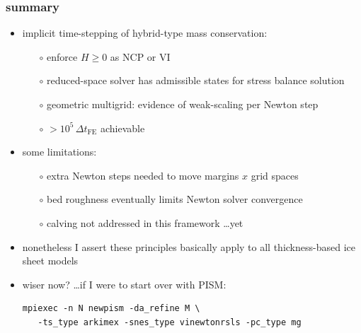 \documentclass[hide notes,intlimits,usenames,dvipsnames]{beamer}
\begin{document}
\begin{frame}[fragile]
\frametitle{summary}
\begin{itemize}
\item implicit time-stepping of hybrid-type mass conservation:
  \begin{itemize}
  \item[$\circ$] enforce $H\ge 0$ as NCP or VI
  \item[$\circ$] reduced-space solver has admissible states for stress balance solution
  \item[$\circ$] geometric multigrid: evidence of weak-scaling per Newton step
  \item[$\circ$] $>10^5 \,\Delta t_{\text{FE}}$ achievable
  \end{itemize}
\item some limitations:
  \begin{itemize}
  \item[$\circ$] extra Newton steps needed to move margins $x$ grid spaces
  \item[$\circ$] bed roughness eventually limits Newton solver convergence
  \item[$\circ$] calving not addressed in this framework \dots yet
  \end{itemize}

\bigskip
\item nonetheless I assert these principles basically apply to all thickness-based ice sheet models
\item wiser now? \dots if I were to start over with PISM:
\scriptsize
\begin{verbatim}
mpiexec -n N newpism -da_refine M \
   -ts_type arkimex -snes_type vinewtonrsls -pc_type mg
\end{verbatim}
\end{itemize}
\end{frame}
\end{document}
